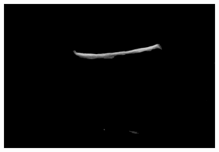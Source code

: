 \begin{figure}[!ht]
\begin{minipage}{0.32\textwidth}
		\includegraphics[width=\textwidth]{./Immagini/nuovo_ecografo_results/4_extracted_femur.png}
	\end{minipage}
\end{figure}

